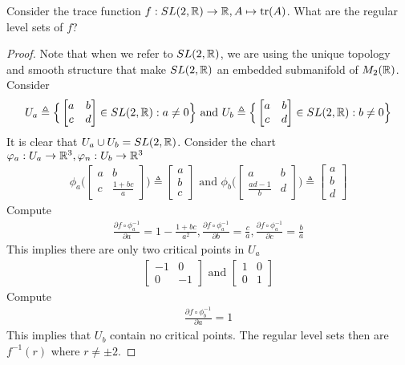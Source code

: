\documentclass{report}
\begin{document}
\begin{question}{}{}
Consider the trace function $f:SL(2,\mathbb{R})\rightarrow \mathbb{R},A\mapsto  \operatorname{tr}(A)$. What are the regular level sets of $f$?  
\end{question}
\begin{proof}
  Note that when we refer to $SL(2,\mathbb{R})$, we are using the unique topology and smooth structure that make  $SL(2,\mathbb{R})$ an embedded submanifold of $M_2(\mathbb{R})$. Consider 
\begin{align*}
U_a\triangleq \Big\{ \begin{bmatrix}
    a & b \\
    c & d
\end{bmatrix}\in SL(2,\mathbb{R}):a\neq 0 \Big\}  \text{ and }U_b\triangleq \Big\{ \begin{bmatrix}
    a & b \\
    c & d
\end{bmatrix}\in SL(2,\mathbb{R}):b\neq 0 \Big\}
\end{align*}
It is clear that $U_a\cup U_b=SL(2,\mathbb{R})$. Consider the chart $\varphi_a:U_a\rightarrow \mathbb{R}^3,\varphi_n:U_b\rightarrow \mathbb{R}^3$ 
\begin{align*}
\phi_a \Big( \begin{bmatrix}
    a & b \\
    c & \frac{1+bc}{a}
\end{bmatrix} \Big)\triangleq  \begin{bmatrix}
a \\
b\\
c
\end{bmatrix}\text{ and }\phi_b\Big(\begin{bmatrix}
    a & b \\
    \frac{ad-1}{b} & d
\end{bmatrix} \Big)\triangleq \begin{bmatrix}
a \\
b \\
d
\end{bmatrix}
\end{align*}
Compute 
\begin{align*}
\frac{\partial f\circ \phi_a^{-1}}{\partial a}= 1- \frac{1+bc}{a^2}, \frac{\partial f\circ \phi_a^{-1}}{\partial b}= \frac{c}{a} , \frac{\partial f\circ \phi_a^{-1}}{\partial c}= \frac{b}{a}
\end{align*}
This implies there are only two critical points in $U_a$ 
\begin{align*}
\begin{bmatrix}
  -1 & 0 \\
  0 & -1
\end{bmatrix}\text{ and }\begin{bmatrix}
  1 & 0 \\
  0 & 1
\end{bmatrix}
\end{align*}
Compute 
\begin{align*}
  \frac{\partial f \circ \phi_b^{-1}}{\partial a}=1 
\end{align*}
This implies that $U_b$ contain no critical points. The regular level sets then are  $f^{-1}(r)$ where $r\neq \pm 2$.
\end{proof}
\end{document}
